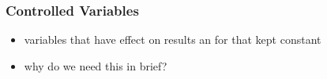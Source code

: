 \subsubsection{Controlled Variables}

\begin{itemize}
	\item variables that have effect on results an for that kept constant
	\item why do we need this in brief?
\end{itemize}